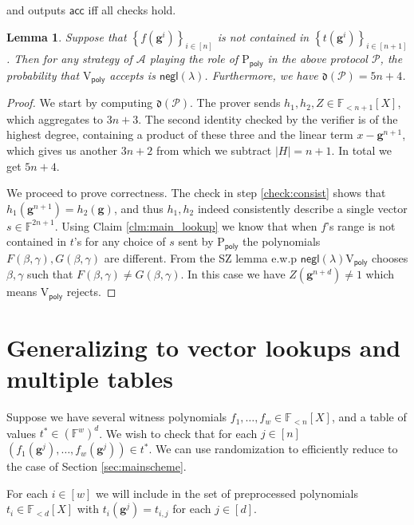 \documentclass[11pt]{article} %
\newcommand{\F}{\ensuremath{\mathbb F}\xspace}
\newcommand{\adv}{\ensuremath{\mathcal A}\xspace}
\newcommand{\negl}{\ensuremath{\mathsf{negl}(\lambda)}\xspace}
\newcommand{\acc}{\ensuremath{\mathsf{acc}}\xspace}
\newcommand{\sett}[2]{\ensuremath{\set{#1}_{#2}}\xspace}
\newcommand{\prvpoly}{\ensuremath{\mathrm{P_{\mathsf{poly}}}}\xspace}
\newcommand{\verpoly}{\ensuremath{\mathrm{V_{\mathsf{poly}}}}\xspace}
\newcommand{\set}[1]{\ensuremath{\left\{#1\right\}}\xspace}
\newcommand{\hgen}{\ensuremath{\mathbf{g}}\xspace}
\newcommand{\polysofdeg}[1]{\ensuremath{\F_{< #1}[X]}\xspace}
\newcommand{\prot}{\ensuremath{\mathscr{P}}\xspace}
\newcommand{\aggdeg}[1]{\ensuremath{\mathfrak{d}(#1)}\xspace}
\newtheorem{lemma}{Lemma}[section]
\newcommand{\sone}{\ensuremath{ h_1}\xspace}
\newcommand{\stwo}{\ensuremath{ h_{2}}\xspace}
\begin{document}
\begin{enumerate}
\begin{enumerate}
 \end{enumerate}

 and outputs \acc iff all checks hold.
\end{enumerate}
\begin{lemma}\label{lem:lookupprot}
 Suppose that $\sett{f(\hgen^i)}{i\in [n]}$ is not contained in  \sett{t(\hgen^i)}{i\in [n+1]}.
 Then for any strategy of \adv playing the role of \prvpoly in the above protocol \prot, the probability that
 \verpoly accepts is \negl.
 Furthermore, we have $\aggdeg{\prot} = 5n+4$.
\end{lemma}
\begin{proof}
We start by computing $\aggdeg{\prot}$.
The prover sends $\sone,\stwo,Z\in \polysofdeg{n+1}$,
which aggregates to $3n+3$. The second identity checked by the verifier is of the highest degree, containing a product of these three and the linear term $x-\hgen^{n+1}$,
which gives us another $3n+2$ from which we subtract $|H|=n+1$.
In total we get $5n+4$.

We proceed to prove correctness. The check in step \ref{check:consist} shows that $\sone(\hgen^{n+1})=\stwo(\hgen)$, and thus $\sone,\stwo$ indeed consistently describe a single vector $s\in \F^{2n+1}$.
Using Claim \ref{clm:main_lookup} we know that when $f$'s range is not contained in $t$'s for any choice of $s$ sent by \prvpoly the polynomials $F(\beta,\gamma), G(\beta,\gamma)$ are different.
 From the SZ lemma e.w.p \negl \verpoly chooses $\beta,\gamma$ such that $F(\beta,\gamma)\neq G(\beta,\gamma)$. In this case we have $Z(\hgen^{n+d})\neq 1$ which means \verpoly rejects.
\end{proof}

\section{Generalizing to vector lookups and multiple tables}
Suppose we have several witness polynomials $f_1,\ldots,f_w \in \polysofdeg{n}$,
and a table of values $t^*\in (\F^w)^d$. 
We wish to check that for each $j\in [n]$
$(f_1(\hgen^j),\ldots,f_w(\hgen^j))\in t^*$.
We can use randomization to efficiently reduce to the case of Section \ref{sec:mainscheme}.

For each $i\in [w]$ we will include in the set of preprocessed polynomials $t_i \in \polysofdeg{d}$ with $t_i(\hgen^j) = t_{i,j}$ for each $j\in [d]$.
\end{document}
